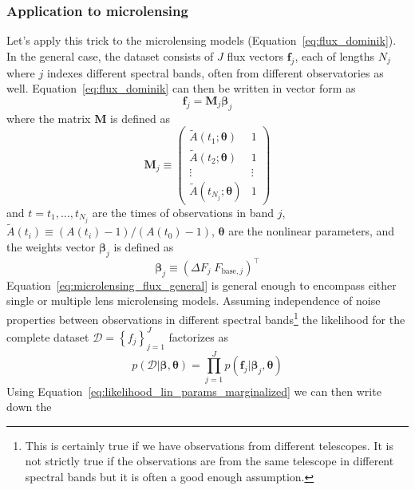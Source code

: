 \documentclass[12pt,dvipsnames]{report}
\renewcommand{\vec}[1]{\boldsymbol{\mathbf{#1}}}
\begin{document}
\subsubsection{Application to microlensing}
Let's apply this trick to the microlensing models
(Equation~\ref{eq:flux_dominik}). In the general case, the dataset consists of
$J$ flux vectors $\vec{f}_j$, each of lengths $N_j$ where $j$ indexes different
spectral bands, often from different observatories as well.
Equation~\ref{eq:flux_dominik} can then be written in vector form as
\begin{equation}
    \vec{f}_j=\vec{M}_j\vec\beta_j
    \label{eq:microlensing_flux_general}
\end{equation}
where the matrix $\vec{M}$ is defined as
\begin{equation}
    \vec{M}_j\equiv \begin{pmatrix}
        \tilde{A}(t_1;\vec{\theta})     & 1      \\
        \tilde{A}(t_2;\vec{\theta})     & 1      \\
        \vdots                          & \vdots \\
        \tilde{A}(t_{N_j};\vec{\theta}) & 1
    \end{pmatrix}
\end{equation}
and $t=t_1,\ldots, t_{N_j}$ are the times of observations in band $j$,
$\tilde{A}(t_i) \equiv (A(t_i)-1) /(A\left(t_{0}\right)-1)$, $\vec{\theta}$ are the
nonlinear parameters, and the weights vector $\vec\beta_j$ is defined as
\begin{equation}
    \vec\beta_j\equiv    \left( \Delta F_j\; F_{\mathrm{base},j}\right)^\intercal
\end{equation}
Equation~\ref{eq:microlensing_flux_general} is general enough to encompass
either single or multiple lens microlensing models. Assuming independence of
noise properties between observations in different spectral bands\footnote{This
    is certainly true if we have observations from different telescopes. It is not
    strictly true if the observations are from the same telescope in different
    spectral bands but it is often a good enough assumption.} the likelihood for
the complete dataset
$\mathcal{D}=\left\{f_{j}\right\}_{j=1}^{J}$ factorizes as
\begin{equation}
    p(\mathcal{D}\lvert \vec\beta, \vec{\theta})=\prod_{j=1}^J p(\vec{f}_j\lvert \vec\beta_j, \vec{\theta})
\end{equation}
Using Equation~\ref{eq:likelihood_lin_params_marginalized} we can then write down the
\end{document}
